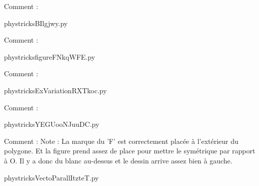     Comment : 

    \clearpage
    


    \newcommand{\CaptionFigBIlgjwy}{<+Type your caption here+>}
    \begin{center}
        
    \end{center}
    phystricksBIlgjwy.py

    Comment : 

    \clearpage
    


    \newcommand{\CaptionFigfigureFNkqWFE}{<+Type your caption here+>}
    \begin{center}
        
    \end{center}
    phystricksfigureFNkqWFE.py

    Comment : 

    \clearpage
    


    \newcommand{\CaptionFigExVariationRXTkoc}{<+Type your caption here+>}
    \begin{center}
        
    \end{center}
    phystricksExVariationRXTkoc.py

    Comment : 

    \clearpage
    


    \newcommand{\CaptionFigYEGUooNJuuDC}{<+Type your caption here+>}
    \begin{center}
        
    \end{center}
    phystricksYEGUooNJuuDC.py

    Comment : Note : La marque du 'F' est correctement placée à l'extérieur du polygone. 
 Et la figure prend assez de place pour mettre le symétrique par rapport à O. Il y a donc du blanc au-dessus et le dessin arrive assez bien à gauche.

    \clearpage
    


    \newcommand{\CaptionFigVectoParallItzteT}{<+Type your caption here+>}
    \begin{center}
        
    \end{center}
    phystricksVectoParallItzteT.py

